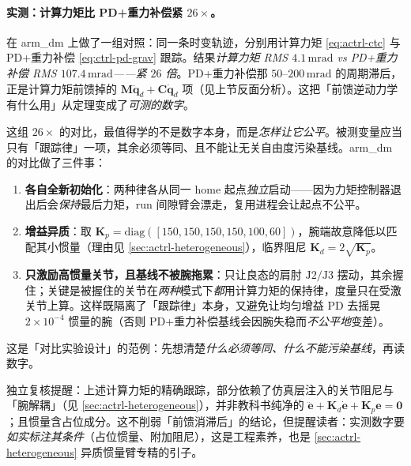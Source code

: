 \paragraph{实测：计算力矩比 PD+重力补偿紧 $26\times$。}
在 arm\_dm 上做了一组对照：同一条时变轨迹，分别用计算力矩 \cref{eq:actrl-ctc} 与 PD+重力补偿 \cref{eq:ctrl-pd-grav} 跟踪。结果\emph{计算力矩 RMS $4.1\,\mathrm{mrad}$ vs PD+重力补偿 RMS $107.4\,\mathrm{mrad}$——紧 $26$ 倍}。PD+重力补偿那 $50$--$200\,\mathrm{mrad}$ 的周期滞后，正是计算力矩前馈掉的 $\mathbf{M}\ddot{\mathbf{q}}_d+\mathbf{C}\dot{\mathbf{q}}_d$ 项（见上节反面分析）。这把「前馈逆动力学有什么用」从定理变成了\emph{可测的数字}。

\begin{note}
这组 $26\times$ 的对比，最值得学的不是数字本身，而是\emph{怎样让它公平}。被测变量应当只有「跟踪律」一项，其余必须等同、且不能让无关自由度污染基线。arm\_dm 的对比做了三件事：
\begin{enumerate}
  \item \textbf{各自全新初始化}：两种律各从同一 home 起点\emph{独立}启动——因为力矩控制器退出后会\emph{保持}最后力矩，run 间隙臂会漂走，复用进程会让起点不公平。
  \item \textbf{增益异质}：取 $\mathbf{K}_p=\mathrm{diag}([150,150,150,150,100,60])$，腕端故意降低以匹配其小惯量（理由见 \cref{sec:actrl-heterogeneous}），临界阻尼 $\mathbf{K}_d=2\sqrt{\mathbf{K}_p}$。
  \item \textbf{只激励高惯量关节，且基线不被腕拖累}：只让良态的肩肘 $\mathrm{J}2/\mathrm{J}3$ 摆动，其余握住；关键是被握住的关节在\emph{两种}模式下\emph{都}用计算力矩的保持律，度量只在受激关节上算。这样既隔离了「跟踪律」本身，又避免让均匀增益 PD 去摇晃 $2\times10^{-4}$ 惯量的腕（否则 PD+重力补偿基线会因腕失稳而\emph{不公平地}变差）。
\end{enumerate}
这是「对比实验设计」的范例：先想清楚\emph{什么必须等同、什么不能污染基线}，再读数字。
\end{note}

\begin{note}
独立复核提醒：上述计算力矩的精确跟踪，部分依赖了仿真层注入的关节阻尼与「腕解耦」（见 \cref{sec:actrl-heterogeneous}），并非教科书纯净的 $\ddot{\mathbf{e}}+\mathbf{K}_d\dot{\mathbf{e}}+\mathbf{K}_p\mathbf{e}=\mathbf{0}$；且惯量含占位成分。这不削弱「前馈消滞后」的结论，但提醒读者：实测数字要\emph{如实标注其条件}（占位惯量、附加阻尼），这是工程素养，也是 \cref{sec:actrl-heterogeneous} 异质惯量臂专精的引子。
\end{note}

